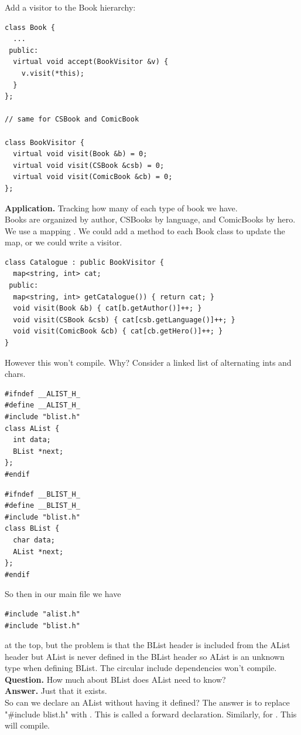 \documentclass[english, 11pt]{article}
\begin{document}
\begin{exmp}
  Add a visitor to the Book hierarchy:

\begin{lstlisting}
class Book {
  ...
 public:
  virtual void accept(BookVisitor &v) {
    v.visit(*this);
  }
};

// same for CSBook and ComicBook

class BookVisitor {
  virtual void visit(Book &b) = 0;
  virtual void visit(CSBook &csb) = 0;
  virtual void visit(ComicBook &cb) = 0;
};
\end{lstlisting}

\textbf{Application.} Tracking how many of each type of book we have. \\

Books are organized by author, CSBooks by language, and ComicBooks by hero. We use a mapping . We could add a method to each Book class to update the map, or we could write a visitor.

\begin{lstlisting}
class Catalogue : public BookVisitor {
  map<string, int> cat;
 public:
  map<string, int> getCatalogue()) { return cat; }
  void visit(Book &b) { cat[b.getAuthor()]++; }
  void visit(CSBook &csb) { cat[csb.getLanguage()]++; }
  void visit(ComicBook &cb) { cat[cb.getHero()]++; }
}
\end{lstlisting}
However this won't compile. Why? Consider a linked list of alternating ints and chars.

\begin{lstlisting}[title=alist.h]
#ifndef __ALIST_H_
#define __ALIST_H_
#include "blist.h"
class AList {
  int data;
  BList *next;
};
#endif
\end{lstlisting}
\begin{lstlisting}[title=blist.h]
#ifndef __BLIST_H_
#define __BLIST_H_
#include "blist.h"
class BList {
  char data;
  AList *next;
};
#endif
\end{lstlisting}
So then in our main file we have
\begin{lstlisting}[title=main.cc]
#include "alist.h"
#include "blist.h"
\end{lstlisting}
at the top, but the problem is that the BList header is included from the AList header but AList is never defined in the BList header so AList is an unknown type when defining BList. The circular include dependencies won't compile. \\
\textbf{Question.} How much about BList does AList need to know? \\
\textbf{Answer.} Just that it exists. \\
So can we declare an AList without having it defined? The answer is to replace "\#include blist.h" with . This is called a forward declaration. Similarly, for . This will compile.
\end{exmp}
\end{document}
